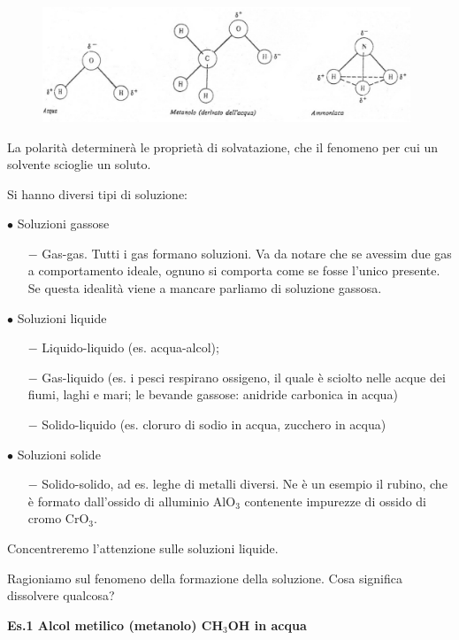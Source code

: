 \begin{figure}[htp]
    \centering
    \includegraphics[width=11cm]{immagini/molecole_polari}
\end{figure}

La polarità determinerà le proprietà di solvatazione, che il fenomeno per cui un solvente scioglie un soluto.

\vspace{0.2cm}Si hanno diversi tipi di soluzione:

\vspace{0.2cm}$\bullet$ Soluzioni gassose
\begin{itemize}
    \item[$-$]Gas-gas. Tutti i gas formano soluzioni. Va da notare che se avessim due gas a comportamento ideale, ognuno si comporta come se fosse l'unico presente. Se questa idealità viene a mancare parliamo di soluzione gassosa.
\end{itemize}

$\bullet$ Soluzioni liquide
\begin{itemize}
    \item[$-$]Liquido-liquido (es. acqua-alcol);
    \item[$-$]Gas-liquido (es. i pesci respirano ossigeno, il quale è sciolto nelle acque dei fiumi, laghi e mari; le bevande gassose: anidride carbonica in acqua)
    \item[$-$]Solido-liquido (es. cloruro di sodio in acqua, zucchero in acqua) 
\end{itemize}
\vspace{0.2cm}$\bullet$ Soluzioni solide
\begin{itemize}
    \item[$-$]Solido-solido, ad es. leghe di metalli diversi. Ne è un esempio il rubino, che è formato dall'ossido di alluminio AlO$_3$ contenente impurezze di ossido di cromo CrO$_3$.
\end{itemize}
Concentreremo l'attenzione sulle soluzioni liquide.

Ragioniamo sul fenomeno della formazione della soluzione. Cosa significa dissolvere qualcosa?

\vspace{0.2cm}\textbf{Es.1 Alcol metilico (metanolo) CH$_3$OH in acqua}

